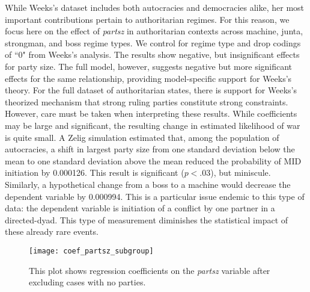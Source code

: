 \documentclass[12pt]{article}
\begin{document}





\par While Weeks's dataset includes both autocracies and democracies alike, her most important contributions pertain to authoritarian regimes. For this reason, we focus here on the effect of \textit{partsz} in authoritarian contexts across machine, junta, strongman, and boss regime types. We control for regime type and drop codings of ``0" from Weeks's analysis. The results show negative, but insignificant effects for party size. The full model, however, suggests negative but more significant effects for the same relationship, providing model-specific support for Weeks's theory. For the full dataset of authoritarian states, there is support for Weeks's theorized mechanism that strong ruling parties constitute strong constraints. However, care must be taken when interpreting these results. While coefficients may be large and significant, the resulting change in estimated likelihood of war is quite small. A Zelig simulation estimated that, among the population of autocracies, a shift in largest party size from one standard deviation below the mean to one standard deviation above the mean reduced the probability of MID initiation by 0.000126. This result is significant ($p<.03$), but miniscule. Similarly, a hypothetical change from a boss to a machine would decrease the dependent variable by 0.000994. This is a particular issue endemic to this type of data: the dependent variable is initiation of a conflict by one partner in a directed-dyad. This type of measurement diminishes the statistical impact of these already rare events.

\begin{figure}
	\texttt{[image: coef\_partsz\_subgroup]}
	\caption{This plot shows regression coefficients on the \textit{partsz} variable after excluding cases with no parties.} 
\end{figure}
\end{document}
